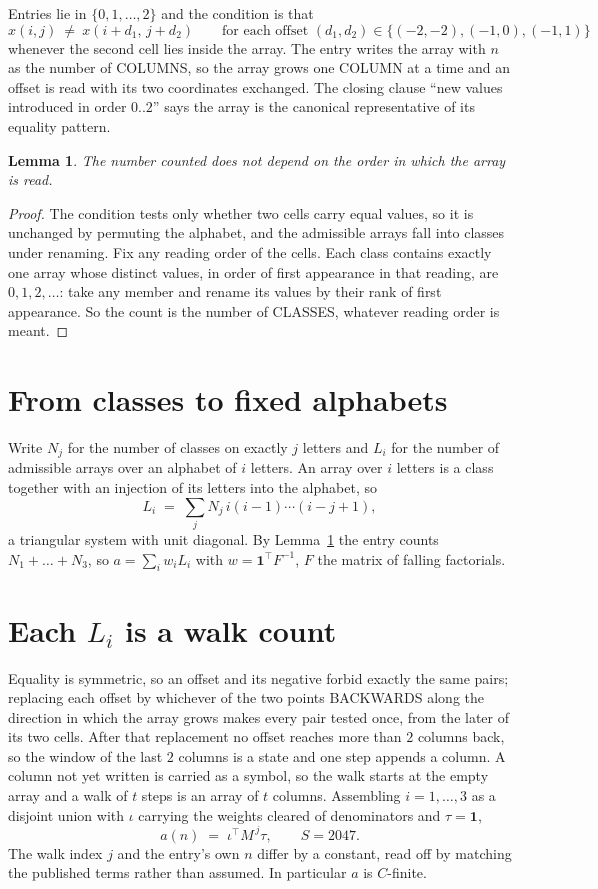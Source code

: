 \documentclass[11pt,a4paper]{article}
\theoremstyle{plain}
\newtheorem{lemma}[theorem]{Lemma}
\theoremstyle{definition}
\begin{document}
Entries lie in $\{0,1,\dots,2\}$ and the condition is that
\[
x(i,j)\ \ne\ x(i+d_1,\,j+d_2)\qquad\text{for each offset }(d_1,d_2)\in\{(-2,-2), (-1,0), (-1,1)\}
\]
whenever the second cell lies inside the array. The entry writes the array with $n$ as the number of COLUMNS, so the array grows one COLUMN at a time and an offset is read with its two coordinates exchanged. The closing clause ``new values
introduced in order $0..2$'' says the array is the canonical representative of its equality
pattern.

\begin{lemma}\label{lem:order}
The number counted does not depend on the order in which the array is read.
\end{lemma}

\begin{proof}
The condition tests only whether two cells carry equal values, so it is unchanged by permuting
the alphabet, and the admissible arrays fall into classes under renaming. Fix any reading order
of the cells. Each class contains exactly one array whose distinct values, in order of first
appearance in that reading, are $0,1,2,\dots$: take any member and rename its values by their
rank of first appearance. So the count is the number of CLASSES, whatever reading order is
meant.
\end{proof}

\section{From classes to fixed alphabets}

Write $N_j$ for the number of classes on exactly $j$ letters and $L_i$ for the number of
admissible arrays over an alphabet of $i$ letters. An array over $i$ letters is a class together
with an injection of its letters into the alphabet, so
\[
L_i\;=\;\sum_j N_j\,i(i-1)\cdots(i-j+1),
\]
a triangular system with unit diagonal. By Lemma~\ref{lem:order} the entry counts
$N_1+\dots+N_{3}$, so $a=\sum_i w_iL_i$ with $w=\mathbf{1}^{\!\top}F^{-1}$, $F$ the
matrix of falling factorials.

\section{Each $L_i$ is a walk count}

Equality is symmetric, so an offset and its negative forbid exactly the same pairs; replacing
each offset by whichever of the two points BACKWARDS along the direction in which the array
grows makes every pair tested once, from the later of its two cells. After that replacement no
offset reaches more than $2$ columns back, so the window of the last $2$
columns is a state and one step appends a column. A column not yet written is
carried as a symbol, so the walk starts at the empty array and a walk of $t$ steps is an array
of $t$ columns. Assembling $i=1,\dots,3$ as a disjoint union with $\iota$ carrying the
weights cleared of denominators and $\tau=\mathbf{1}$,
\[
a(n)\;=\;\iota^{\!\top}M^{\,j}\tau ,\qquad S=2047.
\]
The walk index $j$ and the entry's own $n$ differ by a constant, read off by matching the
published terms rather than assumed. In particular $a$ is $C$-finite.
\end{document}
